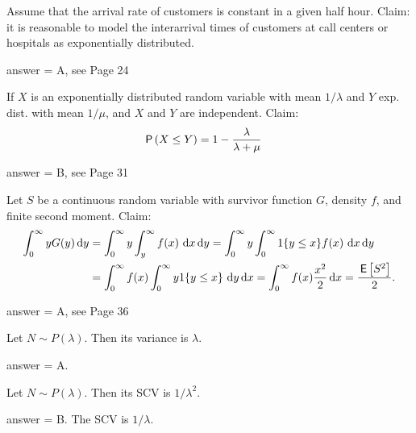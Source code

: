 \begin{exercise}[201807]{1}
Assume that the arrival rate of customers is constant in a given half hour. Claim: it is reasonable to model the interarrival times of customers at call centers or hospitals as  exponentially distributed.
\begin{solution}
answer = A, see Page 24
\end{solution}
\end{exercise}

\begin{exercise}[201807]{1}
If $X$ is an exponentially distributed random variable with mean $1/\lambda$ and $Y$ exp. dist. with mean $1/\mu$, and $X$ and $Y$ are independent. Claim:
\begin{align*}
    \P{X\leq Y} 
&= 1 - \frac{\lambda}{\lambda + \mu} 
\end{align*}

\begin{solution}
answer = B, see Page 31
\end{solution}
\end{exercise}

\begin{exercise}[201807]{1}
Let $S$ be  a continuous random variable with survivor function $G$, density $f$, and finite second moment. Claim:
  \begin{align*}
\int_0^\infty y G(y) \,\text{d}y 
&=  \int_0^\infty y \int_y^\infty f(x)\, \,\text{d}x \,\text{d}y =  \int_0^\infty y \int_0^\infty 1\{y\leq x\}f(x)\, \,\text{d}x \,\text{d}y\\
&=  \int_0^\infty f(x) \int_0^\infty y 1\{y \leq x\}\, \,\text{d}y \,\text{d}x
=  \int_0^\infty f(x) \frac{x^2}2 \,\text{d}x =\frac{\,\mathsf{E}\left[S^2\right]}2.
  \end{align*}

\begin{solution}
answer = A, see Page 36
\end{solution}
\end{exercise}




\begin{exercise}[201902]
Let $N\sim P(\lambda)$. Then its variance is  $\lambda$. 

\begin{solution}
answer = A. %
\end{solution}
\end{exercise}

\begin{exercise}[201902]
Let $N\sim P(\lambda)$. Then its SCV is  $1/\lambda^2$. 
\begin{solution}
answer = B. The SCV is $1/\lambda$. %
\end{solution}
\end{exercise}

